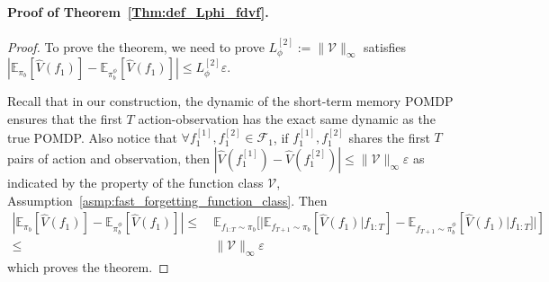 \documentclass[twoside]{article}
\newcommand{\CAL}[1]{\mathcal{#1}}
\begin{document}
\paragraph{Proof of Theorem~\ref{Thm:def_Lphi_fdvf}.}
\begin{proof}
    To prove the theorem, we need to prove $L_\phi^{[2]}:=\|\CAL{V}\|_\infty$ satisfies $|\mathbb{E}_{\pi_b}[\hat{V}(f_1)]-\mathbb{E}_{\pi_b^\phi}[\hat{V}(f_1)]|\leq L_\phi^{[2]}\varepsilon$.

    Recall that in our construction, the dynamic of the short-term memory POMDP ensures that the first $T$ action-observation has the exact same dynamic as the true POMDP. Also notice that $\forall f_1^{[1]},f_1^{[2]}\in\CAL{F}_1$, if $f_1^{[1]},f_1^{[2]}$ shares the first $T$ pairs of action and observation, then $|\hat{V}(f_1^{[1]})-\hat{V}(f_1^{[2]})|\leq \|\CAL{V}\|_\infty\varepsilon$ as indicated by the property of the function class $\CAL{V}$, Assumption~\ref{asmp:fast_forgetting_function_class}. Then
    \begin{align}
        |\mathbb{E}_{\pi_b}[\hat{V}(f_1)]-\mathbb{E}_{\pi_b^\phi}[\hat{V}(f_1)]|\leq&\ \mathbb{E}_{f_{1:T}\sim\pi_b}[|\mathbb{E}_{f_{T+1}\sim\pi_b}[\hat{V}(f_1)|f_{1:T}]-\mathbb{E}_{f_{T+1}\sim\pi_b^\phi}[\hat{V}(f_1)|f_{1:T}]|]\nonumber\\\leq&\  \|\CAL{V}\|_\infty\varepsilon
    \end{align}
    which proves the theorem.
\end{proof}
\end{document}
